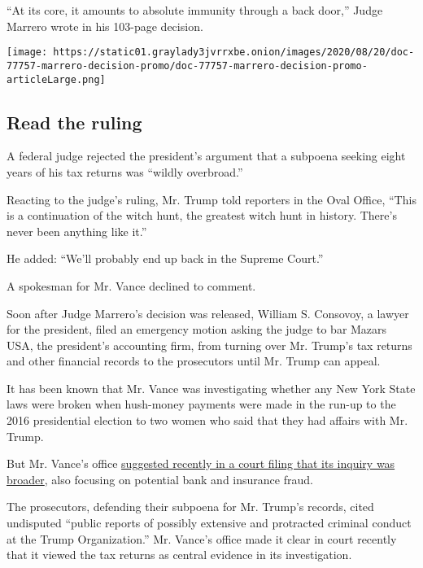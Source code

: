 ``At its core, it amounts to absolute immunity through a back door,''
Judge Marrero wrote in his 103-page decision.

\href{https://www.nytimes3xbfgragh.onion/interactive/2020/08/20/us/marrero-decision.html}{}

\texttt{[image: https://static01.graylady3jvrrxbe.onion/images/2020/08/20/doc-77757-marrero-decision-promo/doc-77757-marrero-decision-promo-articleLarge.png]}

\hypertarget{read-the-ruling}{%
\subsection{Read the ruling}\label{read-the-ruling}}

A federal judge rejected the president's argument that a subpoena
seeking eight years of his tax returns was ``wildly overbroad.''

Reacting to the judge's ruling, Mr. Trump told reporters in the Oval
Office, ``This is a continuation of the witch hunt, the greatest witch
hunt in history. There's never been anything like it.''

He added: ``We'll probably end up back in the Supreme Court.''

A spokesman for Mr. Vance declined to comment.

Soon after Judge Marrero's decision was released, William S. Consovoy, a
lawyer for the president, filed an emergency motion asking the judge to
bar Mazars USA, the president's accounting firm, from turning over Mr.
Trump's tax returns and other financial records to the prosecutors until
Mr. Trump can appeal.

It has been known that Mr. Vance was investigating whether any New York
State laws were broken when hush-money payments were made in the run-up
to the 2016 presidential election to two women who said that they had
affairs with Mr. Trump.

But Mr. Vance's office
\href{https://www.nytimes3xbfgragh.onion/2020/08/03/nyregion/donald-trump-taxes-cyrus-vance.html}{suggested
recently in a court filing that its inquiry was broader}, also focusing
on potential bank and insurance fraud.

The prosecutors, defending their subpoena for Mr. Trump's records, cited
undisputed ``public reports of possibly extensive and protracted
criminal conduct at the Trump Organization.'' Mr. Vance's office made it
clear in court recently that it viewed the tax returns as central
evidence in its investigation.

